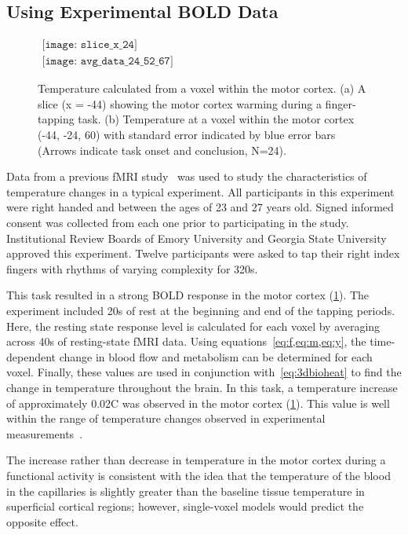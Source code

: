     \subsection{\label{sec:experimentalresults} Using Experimental BOLD Data}
    \FloatBarrier
    \begin{figure}[p] 
    	\begin{center}
    		$ 
    		\begin{array}{c}
    			\texttt{[image: slice\_x\_24]} \\
    			\texttt{[image: avg\_data\_24\_52\_67]} 
    		\end{array}
    		$ 
    	\end{center}
    	\caption[Temperature changes: experimental BOLD data]{\label{fig:realdata} Temperature calculated from a voxel within the motor cortex. (a) A slice (x = -44) showing the motor cortex warming during a finger-tapping task. (b) Temperature at a voxel within the motor cortex (-44, -24, 60) with standard error indicated by blue error bars (Arrows indicate task onset and conclusion, N=24).} 
    \end{figure}
    Data from a previous fMRI study~\citep{dhamala} was used to study the characteristics of temperature changes in a typical experiment. All participants in this experiment were right handed and between the ages of 23 and 27 years old.  Signed informed consent was collected from each one prior to participating in the study.  Institutional Review Boards of Emory University and Georgia State University approved this experiment. Twelve participants were asked to tap their right index fingers with rhythms of varying complexity for 320s. 
    
    This task resulted in a strong BOLD response in the motor cortex (\cref{fig:realdata}). The experiment included 20s of rest at the beginning and end of the tapping periods. Here, the resting state response level is calculated for each voxel by averaging across 40s of resting-state fMRI data. Using equations~\cref{eq:f,eq:m,eq:y}, the time-dependent change in blood flow and metabolism can be determined for each voxel. Finally, these values are used in conjunction with~\cref{eq:3dbioheat} to find the change in temperature throughout the brain. In this task, a temperature increase of approximately 0.02\degree C was observed in the motor cortex (\cref{fig:realdata}).  This value is well within the range of temperature changes observed in experimental measurements~\citep{mcelligott,kiyatkin,zeschke,george,tachibana}. 
    
    The increase rather than decrease in temperature in the motor cortex during a functional activity is consistent with the idea that the temperature of the blood in the capillaries is slightly greater than the baseline tissue temperature in superficial cortical regions; however, single-voxel models would predict the opposite effect.